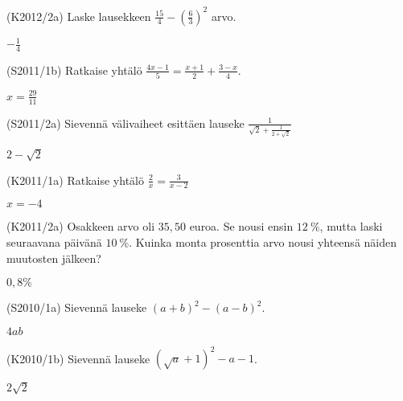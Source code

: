 \begin{tehtava}(K2012/2a)  Laske lausekkeen $ \frac{15}{4} - \left( \frac{6}{3} \right)^2 $ arvo.
\begin{vastaus}
				$-\frac{1}{4}$
				\end{vastaus}
\end{tehtava}

\begin{tehtava}(S2011/1b)  Ratkaise yhtälö
                        $ \frac{4x - 1}{5} = \frac{x + 1}{2} + \frac{3 - x}{4}. $
                        \begin{vastaus}
				$x=\frac{29}{11}$
				\end{vastaus}
\end{tehtava}

\begin{tehtava}(S2011/2a)  Sievennä välivaiheet esittäen lauseke
                     $ \frac{1}{\sqrt{2} + \frac{1}{2 + \sqrt{2}}} $
                     \begin{vastaus}
				$2-\sqrt{2}$
				\end{vastaus}
\end{tehtava}


\begin{tehtava}(K2011/1a)  Ratkaise yhtälö
                        $ \frac{2}{x} = \frac{3}{x - 2} $
\begin{vastaus}
				$x=-4$
				\end{vastaus}
\end{tehtava}

\begin{tehtava}(K2011/2a)  Osakkeen arvo oli $35,50$ euroa. Se nousi ensin $12~\%$,
                        mutta laski seuraavana päivänä $10~\%$. Kuinka monta prosenttia
                        arvo nousi yhteensä näiden muutosten jälkeen?
                        \begin{vastaus}
				$0,8\%$
				\end{vastaus}
\end{tehtava}


\begin{tehtava}(S2010/1a)  Sievennä lauseke $ (a + b)^2 - (a - b)^2 $.
\begin{vastaus}
				$4ab$
				\end{vastaus}
\end{tehtava}

\begin{tehtava}(K2010/1b)  Sievennä lauseke $ (\sqrt{a} + 1)^2 - a - 1 $.
\begin{vastaus}
				$2\sqrt{2}$
				\end{vastaus}
\end{tehtava}

